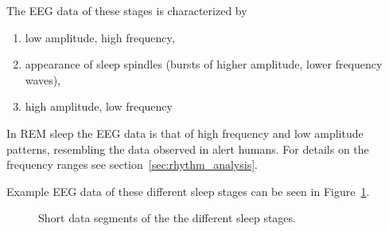 \newpage
The EEG data of these stages is characterized by

\begin{enumerate}[label={S\arabic*:}]
	\item low amplitude, high frequency,
	\item appearance of sleep spindles (bursts of higher amplitude, lower frequency waves),
	\item high amplitude, low frequency
\end{enumerate}

In REM sleep the EEG data is that of high frequency and low amplitude patterns, resembling the data observed in alert humans. \color{change} For details on the frequency ranges see section~\ref{sec:rhythm_analysis}. \color{black}

Example EEG data of these different sleep stages can be seen in Figure~\ref{fig:different_sleep_stages}.

\begin{figure}[h]
	\centering

	\begin{subfigure}[b]{\textwidth}
	\end{subfigure}
	
	\caption{Short data segments of the the different sleep stages.}
	\label{fig:different_sleep_stages}
\end{figure}
